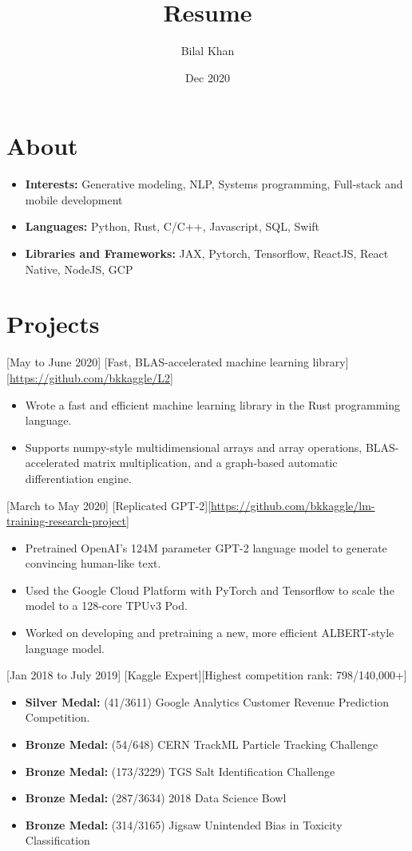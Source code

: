 \documentclass{article}
\title{Resume}
\author{Bilal Khan}
\date{Dec 2020}
\begin{document}
\makecvtitle

\section{About}
\begin{itemize}
\item \textbf{Interests:} Generative modeling, NLP, Systems programming, Full-stack and mobile development
\item \textbf{Languages:} Python, Rust, C/C++, Javascript, SQL, Swift
\item \textbf{Libraries and Frameworks:} JAX, Pytorch, Tensorflow, ReactJS, React Native, NodeJS, GCP
\end{itemize}
 
\section{Projects}

[May to June 2020]
[Fast, BLAS-accelerated machine learning library][\url{https://github.com/bkkaggle/L2}]

\begin{itemize}
    \item Wrote a fast and efficient machine learning library in the Rust programming language.
    \item Supports numpy-style multidimensional arrays and array operations, BLAS-accelerated matrix multiplication, and a graph-based automatic differentiation engine.
\end{itemize}

[March to May 2020]
[Replicated GPT-2][\url{https://github.com/bkkaggle/lm-training-research-project}]

\begin{itemize}
    \item Pretrained OpenAI's 124M parameter GPT-2 language model to generate convincing human-like text.
    \item Used the Google Cloud Platform with PyTorch and Tensorflow to scale the model to a 128-core TPUv3 Pod. 
    \item Worked on developing and pretraining a new, more efficient ALBERT-style language model.
\end{itemize}

[Jan 2018 to July 2019]
[Kaggle Expert][Highest competition rank: 798/140,000+]

\begin{itemize}
    \item \textbf{Silver Medal:} (41/3611) Google Analytics Customer Revenue Prediction Competition.
    \item \textbf{Bronze Medal:} (54/648) CERN TrackML Particle Tracking Challenge
    \item \textbf{Bronze Medal:} (173/3229) TGS Salt Identification Challenge
    \item \textbf{Bronze Medal:} (287/3634) 2018 Data Science Bowl
    \item \textbf{Bronze Medal:} (314/3165) Jigsaw Unintended Bias in Toxicity Classification 
\end{itemize}
\end{document}
